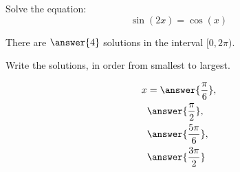 \documentclass{ximera}
\author{Bobby Ramsey}
\begin{document}
\begin{exercise}

	Solve the equation:
	 \[\sin(2x) = \cos(x) \]
	
	There are $\answer{4}$ solutions in the interval $[0, 2\pi)$.	
	\begin{exercise}
		Write the solutions, in order from smallest to largest.
		
		\begin{align*}
			x & = \answer{\frac{\pi}{6}}, \\
			 	& \answer{\frac{\pi}{2}}, \\
			 	& \answer{\frac{5\pi}{6}}, \\
			 	 &\answer{\frac{3\pi}{2}}
		\end{align*}	 	 


	\end{exercise}

\end{exercise}
\end{document}
